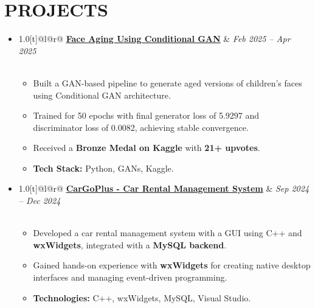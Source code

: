 \documentclass[letterpaper,10pt]{article}
\newcommand{\resumeSubHeadingListStart}{\begin{itemize}[leftmargin=0.15in,label={}]}
\newcommand{\resumeSubHeadingListEnd}{\end{itemize}}
\newcommand{\resumeItemListStart}{\begin{itemize}[leftmargin=12pt]}
\newcommand{\resumeItemListEnd}{\end{itemize}}
\newcommand{\resumeItem}[1]{\item\small{#1}}
\begin{document}
\section{PROJECTS}
\vspace{5 pt}
\resumeSubHeadingListStart

  \item
  \begin{tabular*}{1.0\textwidth}[t]{@{}l@{\extracolsep{\fill}}r@{}}
    \textbf{\large{\underline{Face Aging Using Conditional GAN}}} & \textit{Feb 2025 -- Apr 2025} \\
     \\
  \end{tabular*}
  \resumeItemListStart
      \resumeItem{Built a GAN-based pipeline to generate aged versions of children's faces using Conditional GAN architecture.}
      \resumeItem{Trained for 50 epochs with final generator loss of 5.9297 and discriminator loss of 0.0082, achieving stable convergence.}
      \resumeItem{Received a \textbf{Bronze Medal on Kaggle} with \textbf{21+ upvotes}.}
      \resumeItem{\textbf{Tech Stack:} Python, GANs, Kaggle.}
  \resumeItemListEnd
  \vspace{5pt}

  \item
  \begin{tabular*}{1.0\textwidth}[t]{@{}l@{\extracolsep{\fill}}r@{}}
    \textbf{\large{\underline{CarGoPlus - Car Rental Management System}}} & \textit{Sep 2024 -- Dec 2024} \\
     \\
  \end{tabular*}
  \resumeItemListStart
      \resumeItem{Developed a car rental management system with a GUI using C++ and \textbf{wxWidgets}, integrated with a \textbf{MySQL backend}.}
      \resumeItem{Gained hands-on experience with \textbf{wxWidgets} for creating native desktop interfaces and managing event-driven programming.}
      \resumeItem{\textbf{Technologies:} C++, wxWidgets, MySQL, Visual Studio.}
  \resumeItemListEnd
  \vspace{5pt}

\resumeSubHeadingListEnd



\end{document}
